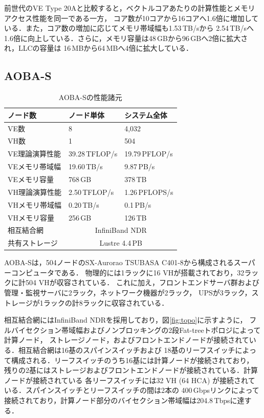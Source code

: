 ﻿\documentclass[submit,techrep,noauthor]{ipsj}
\begin{document}
前世代のVE Type 20Aと比較すると，ベクトルコアあたりの計算性能とメモリアクセス性能を同一である一方，
コア数が10コアから16コアへ1.6倍に増加している．また，コア数の増加に応じてメモリ帯域幅も1.53\,TB/sから
2.54\,TB/sへ1.6倍に向上している．さらに，メモリ容量は48\,GBから96\,GBへ2倍に拡大され，LLCの容量は
16\,MBから64\,MBへ4倍に拡大している．

\subsection{AOBA-S}

\begin{table}
\centering
\caption{AOBA-Sの性能諸元}\label{tbl:aoba-s}
\begin{tabular}{@{}lll@{}}
\toprule
ノード数        & ノード単体     & システム全体           \\ \midrule
VE数            & 8              & 4,032                  \\ \midrule
VH数            & 1              & 504                    \\
VE理論演算性能  & 39.28\,TFLOP/s & 19.79\,PFLOP/s         \\
VEメモリ帯域幅  & 19.60\,TB/s    & 9.87\,PB/s             \\
VEメモリ容量    & 768\,GB        & 378\,TB                \\ \midrule
VH理論演算性能  & 2.50\,TFLOP/s  & 1.26\,PFLOPS/s         \\
VHメモリ帯域幅  & 0.20\,TB/s     & 0.1\,PB/s              \\
VHメモリ容量    & 256\,GB        & 126\,TB                \\ \midrule
相互結合網      & \multicolumn{2}{c}{InfiniBand NDR}      \\
共有ストレージ  & \multicolumn{2}{c}{Lustre 4.4\,PB}      \\ \bottomrule
\end{tabular}
\end{table}

AOBA-Sは，504ノードのSX-Aurorao TSUBASA C401-8から構成されるスーパーコンピュータである．
物理的には1ラックに16 VHが搭載されており，32ラックに計504 VHが収容されている．
これに加え，フロントエンドサーバ群および管理・監視サーバに2ラック，ネットワーク機器が2ラック，
UPSが3ラック，ストレージが1ラックの計8ラックに収容されている．

相互結合網にはInfiniBand NDRを採用しており，図\ref{fig:topo}に示すように，
フルバイセクション帯域幅およびノンブロッキングの2段Fat-treeトポロジによって計算ノード，
ストレージノード，およびフロントエンドノードが接続されている．相互結合網は16基のスパインスイッチおよび
18基のリーフスイッチによって構成される．リーフスイッチのうち16基には計算ノードが接続されており，
残りの2基にはストレージおよびフロントエンドノードが接続されている．計算ノードが接続されている
各リーフスイッチには32 VH (64 HCA) が接続されている．スパインスイッチとリーフスイッチの間は2本の
400\,Gbpsリンクによって接続されており，計算ノード部分のバイセクション帯域幅は204.8\,Tbpsに達する．
\end{document}
